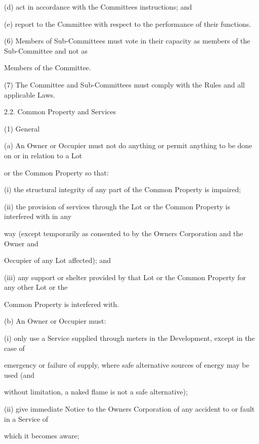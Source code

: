 \documentclass{article}
\begin{document}
{\fontsize{9.962}{1}(d) act in accordance with the Committees instructions; and }

{\fontsize{9.962}{1}(e) report to the Committee with respect to the performance of their functions. }

{\fontsize{9.962}{1}(6) Members of Sub-Committees must vote in their capacity as members of the Sub-Committee and not as }

{\fontsize{10.02}{1}Members of the Committee. }

{\fontsize{9.962}{1}(7) The Committee and Sub-Committees must comply with the Rules and all applicable Laws. }

{\fontsize{9.99}{1}2.2. Common Property and Services }

{\fontsize{9.962}{1}(1) General }

{\fontsize{9.962}{1}(a) An Owner or Occupier must not do anything or permit anything to be done on or in relation to a Lot }

{\fontsize{10.02}{1}or the Common Property so that: }

{\fontsize{9.962}{1}(i) the structural integrity of any part of the Common Property is impaired; }

{\fontsize{9.962}{1}(ii) the provision of services through the Lot or the Common Property is interfered with in any }

{\fontsize{10.02}{1}way (except temporarily as consented to by the Owners Corporation and the Owner and }

{\fontsize{10.02}{1}Occupier of any Lot affected); and }

{\fontsize{9.962}{1}(iii) any support or shelter provided by that Lot or the Common Property for any other Lot or the }

{\fontsize{10.02}{1}Common Property is interfered with. }

{\fontsize{9.962}{1}(b) An Owner or Occupier must: }

{\fontsize{9.962}{1}(i) only use a Service supplied through meters in the Development, except in the case of }

{\fontsize{10.02}{1}emergency or failure of supply, where safe alternative sources of energy may be used (and }

{\fontsize{10.02}{1}without limitation, a naked flame is not a safe alternative); }

{\fontsize{9.962}{1}(ii) give immediate Notice to the Owners Corporation of any accident to or fault in a Service of }

{\fontsize{10.02}{1}which it becomes aware; }
\end{document}
